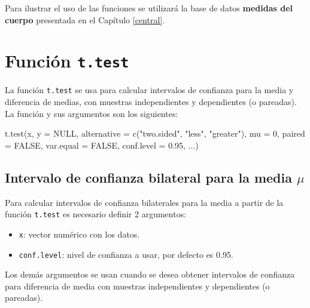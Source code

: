 \documentclass[
]{book}
\makeatletter
\newenvironment{Shaded}{\begin{snugshade}}{\end{snugshade}}
\newcommand{\AttributeTok}[1]{\textcolor[rgb]{0.77,0.63,0.00}{#1}}
\newcommand{\ConstantTok}[1]{\textcolor[rgb]{0.00,0.00,0.00}{#1}}
\newcommand{\DecValTok}[1]{\textcolor[rgb]{0.00,0.00,0.81}{#1}}
\newcommand{\FloatTok}[1]{\textcolor[rgb]{0.00,0.00,0.81}{#1}}
\newcommand{\FunctionTok}[1]{\textcolor[rgb]{0.00,0.00,0.00}{#1}}
\newcommand{\NormalTok}[1]{#1}
\newcommand{\StringTok}[1]{\textcolor[rgb]{0.31,0.60,0.02}{#1}}
\providecommand{\tightlist}{%
  \setlength{\itemsep}{0pt}\setlength{\parskip}{0pt}}
\newenvironment{kframe}{%
\medskip{}
\setlength{\fboxsep}{.8em}
 \def\at@end@of@kframe{}%
 \ifinner\ifhmode%
  \def\at@end@of@kframe{\end{minipage}}%
  \begin{minipage}{\columnwidth}%
 \fi\fi%
 \def\FrameCommand##1{\hskip\@totalleftmargin \hskip-\fboxsep
 \colorbox{shadecolor}{##1}\hskip-\fboxsep
     \hskip-\linewidth \hskip-\@totalleftmargin \hskip\columnwidth}%
 \MakeFramed {\advance\hsize-\width
   \@totalleftmargin\z@ \linewidth\hsize
   \@setminipage}}%
 {\par\unskip\endMakeFramed%
 \at@end@of@kframe}
\renewenvironment{Shaded}{\begin{kframe}}{\end{kframe}}
\makeatother
\begin{document}
Para ilustrar el uso de las funciones se utilizará la base de datos \textbf{medidas del cuerpo} presentada en el Capítulo \ref{central}.

\hypertarget{funciuxf3n-t.test}{%
\section{\texorpdfstring{Función \texttt{t.test}}{Función t.test}}\label{funciuxf3n-t.test}}

La función \texttt{t.test} se usa para calcular intervalos de confianza para la media y diferencia de medias, con muestras independientes y dependientes (o pareadas). La función y sus argumentos son los siguientes:

\begin{Shaded}
\begin{Highlighting}[]
\FunctionTok{t.test}\NormalTok{(x, }\AttributeTok{y =} \ConstantTok{NULL}\NormalTok{,}
       \AttributeTok{alternative =} \FunctionTok{c}\NormalTok{(}\StringTok{"two.sided"}\NormalTok{, }\StringTok{"less"}\NormalTok{, }\StringTok{"greater"}\NormalTok{),}
       \AttributeTok{mu =} \DecValTok{0}\NormalTok{, }\AttributeTok{paired =} \ConstantTok{FALSE}\NormalTok{, }\AttributeTok{var.equal =} \ConstantTok{FALSE}\NormalTok{,}
       \AttributeTok{conf.level =} \FloatTok{0.95}\NormalTok{, ...)}
\end{Highlighting}
\end{Shaded}

\hypertarget{intervalo-de-confianza-bilateral-para-la-media-mu}{%
\subsection{\texorpdfstring{Intervalo de confianza bilateral para la media \(\mu\)}{Intervalo de confianza bilateral para la media \textbackslash mu}}\label{intervalo-de-confianza-bilateral-para-la-media-mu}}

Para calcular intervalos de confianza bilaterales para la media a partir de la función \texttt{t.test} es necesario definir 2 argumentos:

\begin{itemize}
\tightlist
\item
  \texttt{x}: vector numérico con los datos.
\item
  \texttt{conf.level}: nivel de confianza a usar, por defecto es 0.95.
\end{itemize}

Los demás argumentos se usan cuando se desea obtener intervalos de confianza para diferencia de media con muestras independientes y dependientes (o pareadas).
\end{document}
